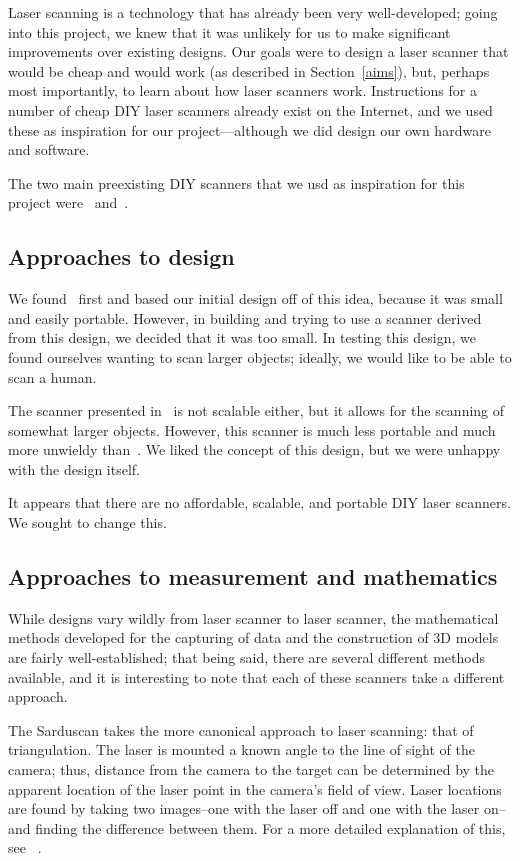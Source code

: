 \documentclass[12pt, letterpaper]{article}
\begin{document}
Laser scanning is a technology that has already been very well-developed; going into
this project, we knew that it was unlikely for us to make significant improvements
over existing designs. Our goals were to design a laser scanner that would be cheap
and would work (as described in Section~\ref{aims}), but, perhaps most importantly,
to learn about how laser scanners work. Instructions for a number of cheap DIY laser
scanners already exist on the Internet, and we used these as inspiration for our
project---although we did design our own hardware and software.

The two main preexisting DIY scanners that we usd as inspiration for this project
were~\cite{sardau} and~\cite{dentroman}. 

\subsection{Approaches to design}
We found~\cite{sardau} first and based
our initial design off of this idea, because it was small and easily portable. However,
in building and trying to use a scanner derived from this design, we decided that it
was too small. In testing this design, we found ourselves wanting to scan larger objects;
ideally, we would like to be able to scan a human.

The scanner presented in~\cite{dentroman} is not scalable either, but it allows for the
scanning of somewhat larger objects. However, this scanner is much less portable and much
more unwieldy than~\cite{sardau}. We liked the concept of this design, but we were unhappy
with the design itself.

It appears that there are no affordable, scalable, and portable DIY laser scanners.
We sought to change this.

\subsection{Approaches to measurement and mathematics}
While designs vary wildly from laser scanner to laser scanner, the mathematical methods developed for the capturing of data and the construction of 3D models are fairly well-established; that being said, there are several different methods available, and it is interesting to note that each of these scanners take a different approach.

The Sarduscan takes the more canonical approach to laser scanning: that of triangulation. The laser is mounted a known angle to the line of sight of the camera; thus, distance from the camera to the target can be determined by the apparent location of the laser point in the camera's field of view. Laser locations are found by taking two images--one with the laser off and one with the laser on--and finding the difference between them. For a more detailed explanation of this, see ~\cite{triangulation}.
\end{document}
